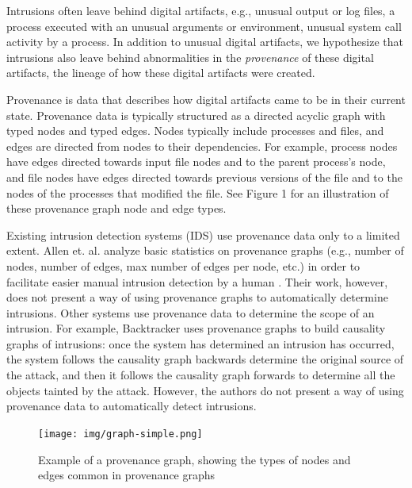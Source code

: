 \documentclass[10pt,twocolumn]{article}
\begin{document}
Intrusions often leave behind digital artifacts, e.g., unusual output or log files, a process executed
with an unusual arguments or environment, unusual system call activity by a process. In addition to
unusual digital artifacts, we hypothesize that
intrusions also leave behind abnormalities
in the {\em provenance} of these digital artifacts, the lineage of how these digital artifacts were created.

Provenance is data that describes how digital artifacts
came to be in their current state. Provenance data is typically structured as a directed acyclic graph with
typed nodes and typed edges.
Nodes typically include processes and files, and edges are directed from nodes to their dependencies. For example,
process nodes have edges directed towards input file nodes and to the parent process's node, and
file nodes have edges directed towards previous versions of the file and to the nodes of the
processes that modified the file. See Figure 1 for an illustration of these provenance
graph node and edge types.

Existing intrusion detection systems (IDS) use provenance data only to a limited extent.
Allen et. al. analyze
basic statistics on provenance graphs (e.g., number of nodes, number of edges, max number of edges per node, etc.) in order to facilitate
easier manual intrusion detection by a human \cite{provstat}. Their work, however, does not present a way of using provenance
graphs to automatically determine intrusions. Other systems use provenance data to determine the scope of an
intrusion. For example, Backtracker \cite{backtracker} uses provenance graphs to build causality graphs of intrusions: once the
system has
determined an intrusion has occurred, the system follows the causality graph backwards determine the original source of the attack, and 
then it follows the causality graph forwards to determine all the objects tainted by the attack. However, the authors 
do not present a way of using provenance data to automatically detect intrusions.

\begin{figure}
  \label{graph-simple}
  \centering
    \texttt{[image: img/graph-simple.png]}
    \caption{Example of a provenance graph, showing the types of nodes and edges common in provenance graphs} 
\end{figure}
\end{document}
